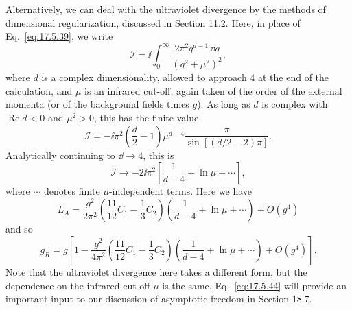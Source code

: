 Alternatively, we can deal with the ultraviolet divergence by the methods
of dimensional regularization, discussed in Section 11.2. Here, in place of
Eq.~\eqref{eq:17.5.39}, we write
\begin{equation}
\mathcal I=\ii\int_0^\infty\frac{2\pi^2q^{d-1}\,\dd q}{(q^2+\mu^2)^2},
\label{eq:17.5.42}
\end{equation}
where $d$ is a complex dimensionality, allowed to approach 4 at the end of
the calculation, and $\mu$ is an infrared cut-off, again taken of the order of
the external momenta (or of the background fields times $g$). As long as
$d$ is complex with $\operatorname{Re}d<0$ and $\mu^2>0$, this has the finite
value
\[
\mathcal I=-\ii\pi^2\left(\frac d2-1\right)\mu^{d-4}
\frac{\pi}{\sin[(d/2-2)\pi]}.
\]
Analytically continuing to $\dd\to4$, this is
\begin{equation}
\mathcal I\longrightarrow-2\ii\pi^2
\left[\frac1{d-4}+\ln\mu+\cdots\right],
\label{eq:17.5.43}
\end{equation}
where $\cdots$ denotes finite $\mu$-independent terms. Here we have
\[
L_A=\frac{g^2}{2\pi^2}\left(\frac{11}{12}C_1-\frac13C_2\right)
\left(\frac1{d-4}+\ln\mu+\cdots\right)+O(g^4)
\]
and so
\begin{equation}
g_R=g\left[1-\frac{g^2}{4\pi^2}
\left(\frac{11}{12}C_1-\frac13C_2\right)
\left(\frac1{d-4}+\ln\mu+\cdots\right)+O(g^4)\right].
\label{eq:17.5.44}
\end{equation}
Note that the ultraviolet divergence here takes a different form, but the
dependence on the infrared cut-off $\mu$ is the same. Eq.~\eqref{eq:17.5.44}
will provide an important input to our discussion of asymptotic freedom in
Section 18.7.
